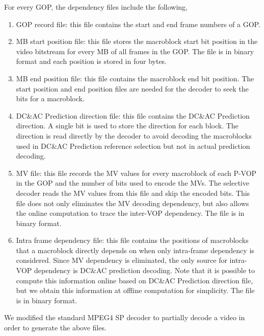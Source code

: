 For every GOP, the dependency files include the following,
\begin{enumerate}
\item GOP record file: this file contains the start and end frame numbers of a GOP. 
\item MB start position file: this file stores the macroblock start bit position in the video bitstream for every MB of all frames in the GOP. The file is in binary format and each position is stored in four bytes. 
\item MB end position file: this file contains the macroblock end bit position. The start position and end position files are needed for the decoder to seek the bits for a macroblock. 
\item DC\&AC Prediction direction file: this file contains the DC\&AC Prediction direction. A single bit is used to store the direction for each block. The direction is read directly by the decoder to avoid decoding the macroblocks used in DC\&AC Prediction reference selection but not in actual prediction decoding. 
\item MV file: this file records the MV values for every macroblock of each P-VOP in the GOP and the number of bits used to encode the MVs. The selective decoder reads the MV values from this file and skip the encoded bits. This file does not only eliminates the MV decoding dependency, but also allows the online computation to trace the inter-VOP dependency. The file is in binary format.
\item Intra frame dependency file: this file contains the positions of macroblocks that a macroblock directly depends on when only intra-frame dependency is considered. Since MV dependency is eliminated, the only source for intra-VOP dependency is DC\&AC prediction decoding. Note that it is possible to compute this information online based on DC\&AC Prediction direction file, but we obtain this information at offline computation for simplicity. The file is in binary format. 
\end{enumerate}
We modified the standard MPEG4 SP decoder to partially decode a video in order to generate the above files. 

 



